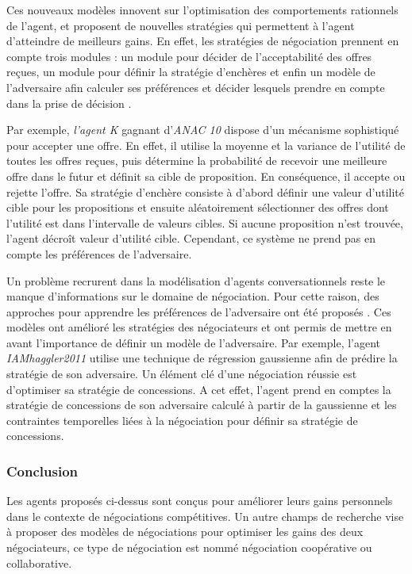			Ces nouveaux modèles innovent sur l'optimisation des comportements rationnels de l'agent, et proposent de nouvelles stratégies qui permettent à l'agent d'atteindre de meilleurs gains. 
			En effet, les stratégies de négociation prennent en compte trois modules : un module pour décider de l'acceptabilité des offres reçues, un module pour définir la stratégie d'enchères et enfin un modèle de l'adversaire afin calculer ses préférences et décider lesquels prendre en compte dans la prise de décision \cite{baarslag2014decoupling}.
			
			Par exemple, \textit{l'agent K} \cite{kawaguchi2011compromising} gagnant d'\emph{ANAC 10} dispose d'un mécanisme sophistiqué pour accepter une offre. En effet, il utilise la moyenne et la variance de l'utilité de toutes les offres reçues, puis détermine la probabilité de recevoir une meilleure offre dans le futur et définit sa cible de proposition. En conséquence, il accepte ou rejette l'offre. Sa stratégie d'enchère consiste à d'abord définir une valeur d'utilité cible pour les propositions et ensuite aléatoirement sélectionner des offres dont l'utilité est dans l'intervalle de valeurs cibles. Si aucune proposition n'est trouvée, l'agent décroît valeur d'utilité cible.	Cependant, ce système ne prend pas en compte les préférences de l'adversaire. 
			
			Un problème recrurent dans la modélisation d'agents conversationnels reste le manque d'informations sur le domaine de négociation. Pour cette raison, des approches pour apprendre les préférences de l'adversaire ont été proposés  \cite{williams2011using,jonker2012negotiating,frieder2013value,hindriks2008creating,hindriks2008opponent}. Ces modèles ont amélioré les stratégies des négociateurs et ont permis de mettre en avant l'importance de définir un modèle de l'adversaire. Par exemple, l'agent \textit{IAMhaggler2011} \cite{williams2011using} utilise une technique de régression gaussienne afin de prédire la stratégie de son adversaire. Un élément clé d'une négociation réussie est d'optimiser sa stratégie de concessions. A cet effet, l'agent prend en comptes la stratégie de concessions de son adversaire calculé à partir de la gaussienne et les contraintes temporelles liées à la négociation pour définir sa stratégie de concessions. 
			
	\subsubsection{Conclusion}		
	Les agents proposés ci-dessus sont conçus pour améliorer leurs gains personnels dans le contexte de négociations compétitives. Un autre champs de recherche vise à proposer des modèles de négociations pour optimiser les gains des deux négociateurs, ce type de négociation est nommé négociation coopérative ou collaborative. 
	
